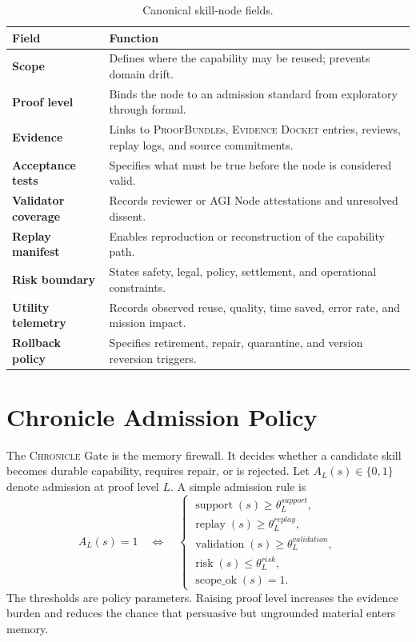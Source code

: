 \documentclass[10.5pt]{article}
\theoremstyle{goThm}
\newcommand{\chronicle}{\textsc{Chronicle}}
\newcommand{\pb}{\textsc{ProofBundle}}
\newcommand{\ed}{\textsc{Evidence Docket}}
\begin{document}
\begin{table}[H]
\centering
\caption{Canonical skill-node fields.}
\label{tab:nodefields}
\begin{tabularx}{\textwidth}{>{\bfseries\color{goNavy}}p{}X}
\toprule
Field & Function \\
\midrule
Scope & Defines where the capability may be reused; prevents domain drift. \\
Proof level & Binds the node to an admission standard from exploratory through formal. \\
Evidence & Links to \pb{}s, \ed{} entries, reviews, replay logs, and source commitments. \\
Acceptance tests & Specifies what must be true before the node is considered valid. \\
Validator coverage & Records reviewer or AGI Node attestations and unresolved dissent. \\
Replay manifest & Enables reproduction or reconstruction of the capability path. \\
Risk boundary & States safety, legal, policy, settlement, and operational constraints. \\
Utility telemetry & Records observed reuse, quality, time saved, error rate, and mission impact. \\
Rollback policy & Specifies retirement, repair, quarantine, and version reversion triggers. \\
\bottomrule
\end{tabularx}
\end{table}

\section{Chronicle Admission Policy}
The \chronicle{} Gate is the memory firewall. It decides whether a candidate skill becomes durable capability, requires repair, or is rejected. Let \(A_L(s)\in\{0,1\}\) denote admission at proof level \(L\). A simple admission rule is
\begin{equation}
A_L(s)=1 \quad\Longleftrightarrow\quad
\begin{cases}
\operatorname{support}(s)\ge \theta^{support}_L,\\
\operatorname{replay}(s)\ge \theta^{replay}_L,\\
\operatorname{validation}(s)\ge \theta^{validation}_L,\\
\operatorname{risk}(s)\le \theta^{risk}_L,\\
\operatorname{scope\_ok}(s)=1. 
\end{cases}
\end{equation}
The thresholds are policy parameters. Raising proof level increases the evidence burden and reduces the chance that persuasive but ungrounded material enters memory.
\end{document}
